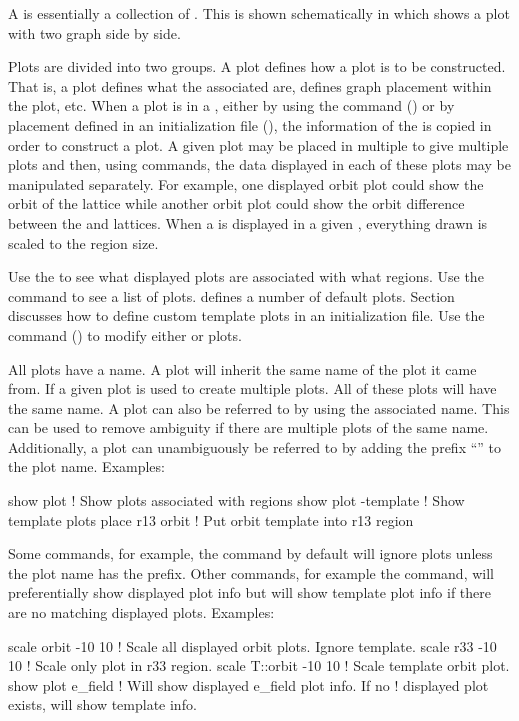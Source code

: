 {{{A  is essentially a collection of . This is shown schematically in
 which shows a plot with two graph side by side.

Plots are divided into two groups. A  plot defines how a  plot is to be
constructed. That is, a  plot defines what the associated  are, defines
graph placement within the plot, etc. When a  plot is  in a ,
either by using the  command () or by placement defined in an initialization
file (), the information of the  is copied in order to construct a
 plot. A given  plot may be placed in multiple  to give
multiple  plots and then, using  commands, the data displayed in each of these
plots may be manipulated separately. For example, one displayed orbit plot could show the orbit of
the  lattice while another orbit plot could show the orbit difference between the
 and  lattices. When a  is displayed in a given ,
everything drawn is scaled to the region size.

Use the  to see what displayed plots are associated with what regions. Use the
 command to see a list of  plots. \tao defines a number of
default  plots. Section~ discusses how to define custom template
plots in an initialization file. Use the  command () to modify either
 or  plots.

All plots have a name. A  plot will inherit the same name of the  plot it
came from. If a given  plot is used to create multiple  plots. All of
these plots will have the same name. A  plot can also be referred to by using the
associated  name. This can be used to remove ambiguity if there are multiple
 plots of the same name. Additionally, a  plot can unambiguously be
referred to by adding the prefix ``'' to the plot name. Examples:
\begin{example}
  show plot           ! Show plots associated with regions
  show plot -template ! Show template plots
  place r13 orbit     ! Put orbit template into r13 region
\end{example}

Some commands, for example, the  command by default will ignore  plots unless
the plot name has the  prefix. Other commands, for example the  command, will
preferentially show displayed plot info but will show template plot info if there are no matching
displayed plots. Examples:
\begin{example}
  scale orbit -10 10    ! Scale all displayed orbit plots. Ignore template.
  scale r33 -10 10      ! Scale only plot in r33 region.
  scale T::orbit -10 10 ! Scale template orbit plot.
  show plot e_field     ! Will show displayed e_field plot info. If no
                        ! displayed plot exists, will show template info.
\end{example}

}}}
